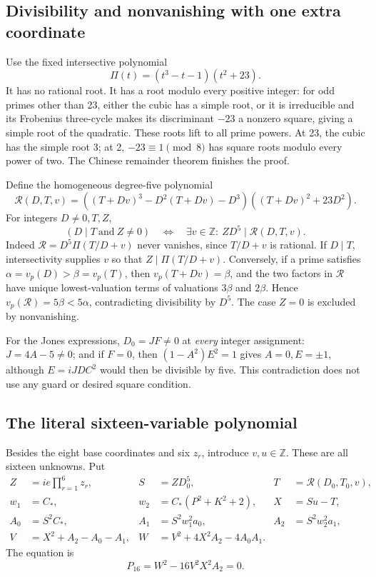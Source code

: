 \subsection{Divisibility and nonvanishing with one extra coordinate}

Use the fixed intersective polynomial
\[
 \Pi(t)=(t^3-t-1)(t^2+23).
\]
It has no rational root.  It has a root modulo every positive integer:
for odd primes other than 23, either the cubic has a simple root, or
it is irreducible and its Frobenius three-cycle makes its discriminant
\(-23\) a nonzero square, giving a simple root of the quadratic.
These roots lift to all prime powers.  At 23, the cubic has the simple
root 3; at 2, \(-23\equiv1\pmod8\) has square roots modulo every
power of two.  The Chinese remainder theorem finishes the proof.

Define the homogeneous degree-five polynomial
\[
 \mathcal R(D,T,v)=
 ((T+Dv)^3-D^2(T+Dv)-D^3)((T+Dv)^2+23D^2).
\]
For integers \(D\ne0,T,Z\),
\[
 (D\mid T\ \text{and}\ Z\ne0)
 \quad\Longleftrightarrow\quad
 \exists v\in\mathbb Z:\ ZD^5\mid\mathcal R(D,T,v).
 \tag{IM}\label{eq:IM16}
\]
Indeed \(\mathcal R=D^5\Pi(T/D+v)\) never vanishes, since
\(T/D+v\) is rational.  If \(D\mid T\), intersectivity supplies
\(v\) so that \(Z\mid\Pi(T/D+v)\).  Conversely, if a prime
satisfies \(\alpha=v_p(D)>\beta=v_p(T)\), then
\(v_p(T+Dv)=\beta\), and the two factors in \(\mathcal R\)
have unique lowest-valuation terms of valuations \(3\beta\)
and \(2\beta\).  Hence
\(v_p(\mathcal R)=5\beta<5\alpha\), contradicting divisibility
by \(D^5\).  The case \(Z=0\) is excluded by nonvanishing.

For the Jones expressions, \(D_0=JF\ne0\) at \emph{every}
integer assignment: \(J=4A-5\ne0\); and if \(F=0\), then
\((1-A^2)E^2=1\) gives \(A=0,E=\pm1\), although
\(E=iJDC^2\) would then be divisible by five.  This contradiction
does not use any guard or desired square condition.

\subsection{The literal sixteen-variable polynomial}

Besides the eight base coordinates and six \(z_r\), introduce
\(v,u\in\mathbb Z\).  These are all sixteen unknowns.  Put
\begin{align*}
 Z&=ie\prod_{r=1}^{6}z_r,& S&=ZD_0^5,&T&=\mathcal R(D_0,T_0,v),\\
 w_1&=C_*,&w_2&=C_*(P^2+K^2+2),&X&=Su-T,\\
 A_0&=S^2C_*,& A_1&=S^2w_1^2a_0,& A_2&=S^2w_2^2a_1,\\
 V&=X^2+A_2-A_0-A_1,&W&=V^2+4X^2A_2-4A_0A_1.&
\end{align*}
The equation is
\[
 \boxed{\quad P_{16}=W^2-16V^2X^2A_2=0.\quad}
\]

